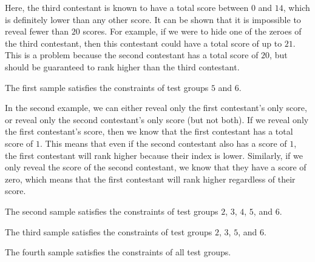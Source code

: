 Here, the third contestant is known to have a total score between $0$ and $14$, which
is definitely lower than any other score. It can be shown that it is impossible
to reveal fewer than $20$ scores. For example, if we were to hide one of the 
zeroes of the third contestant, then this contestant could have a total score 
of up to $21$. This is a problem because the second contestant has a total score
of $20$, but should be guaranteed to rank higher than the third contestant.

The first sample satisfies the constraints of test groups $5$ and $6$.

In the second example, we can either reveal only the first contestant's only score, or reveal only the second contestant's only score (but not both). If we reveal only the first contestant's score, then we know that the first contestant has a total score of $1$. This means that even if the second contestant also has a score of $1$, the first contestant will rank higher because their index 
is lower. Similarly, if we only reveal the score of the second contestant, we know 
that they have a score of zero, which means that the first contestant will rank higher 
regardless of their score. 

The second sample satisfies the constraints of test groups $2$, $3$, $4$, $5$, and $6$.

The third sample satisfies the constraints of test groups $2$, $3$, $5$, and $6$.

The fourth sample satisfies the constraints of all test groups.

